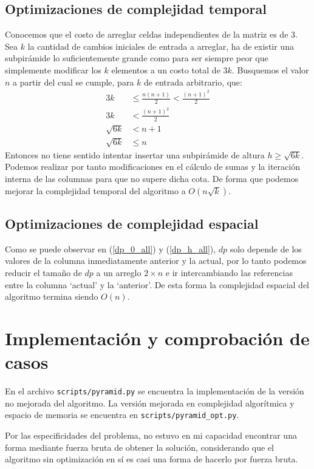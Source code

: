 \documentclass{article}
\theoremstyle{default}
\begin{document}
	\subsection{Optimizaciones de complejidad temporal}
		Conocemos que el costo de arreglar celdas independientes de la matriz es de 3. Sea $k$ la cantidad de cambios iniciales de entrada a arreglar, ha de existir una subpirámide lo suficientemente grande como para ser siempre peor que simplemente modificar los $k$ elementos a un costo total de $3k$. Busquemos el valor $n$ a partir del cual se cumple, para $k$ de entrada arbitrario, que:
		\begin{align*}
			3k 			& \leq \frac{n(n+1)}{2} 	< \frac{(n+1)^2}{2}	\\
			3k 			& < \frac{(n+1)^2}{2}							\\
			\sqrt{6k} 	& < n + 1										\\
			\sqrt{6k}	& \leq n
		\end{align*}
		Entonces no tiene sentido intentar insertar una subpirámide de altura $h \geq \sqrt{6k}$. Podemos realizar por tanto modificaciones en el cálculo de sumas y la iteración interna de las columnas para que no supere dicha cota. De forma que podemos mejorar la complejidad temporal del algoritmo a $O(n\sqrt{k})$.
	\subsection{Optimizaciones de complejidad espacial}
		Como se puede observar en (\ref{dp_0_all}) y (\ref{dp_h_all}), $dp$ solo depende de los valores de la columna inmediatamente anterior y la actual, por lo tanto podemos reducir el tamaño de $dp$ a un arreglo $2 \times n$ e ir intercambiando las referencias entre la columna `actual' y la `anterior'. De esta forma la complejidad espacial del algoritmo termina siendo $O(n)$.
\section{Implementación y comprobación de casos}
	En el archivo \texttt{scripts/pyramid.py} se encuentra la implementación de la versión no mejorada del algoritmo. La versión mejorada en complejidad algorítmica y espacio de memoria se encuentra en \texttt{scripts/pyramid\_opt.py}.
	
	Por las especificidades del problema, no estuvo en mi capacidad encontrar una forma mediante fuerza bruta de obtener la solución, considerando que el algoritmo sin optimización en sí es casi una forma de hacerlo por fuerza bruta.
\end{document}
